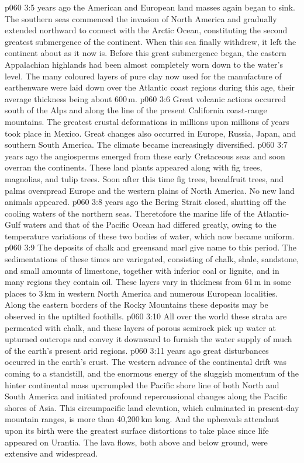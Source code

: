 \vs p060 3:5 \pc {} years ago the American and European land masses again began to sink. The southern seas commenced the invasion of North America and gradually extended northward to connect with the Arctic Ocean, constituting the second greatest submergence of the continent. When this sea finally withdrew, it left the continent about as it now is. Before this great submergence began, the eastern Appalachian highlands had been almost completely worn down to the water’s level. The many coloured layers of pure clay now used for the manufacture of earthenware were laid down over the Atlantic coast regions during this age, their average thickness being about 600\,m.
\vs p060 3:6 Great volcanic actions occurred south of the Alps and along the line of the present California coast\hyp{}range mountains. The greatest crustal deformations in millions upon millions of years took place in Mexico. Great changes also occurred in Europe, Russia, Japan, and southern South America. The climate became increasingly diversified.
\vs p060 3:7 \pc {} years ago the angiosperms emerged from these early Cretaceous seas and soon overran the continents. These land plants  appeared along with fig trees, magnolias, and tulip trees. Soon after this time fig trees, breadfruit trees, and palms overspread Europe and the western plains of North America. No new land animals appeared.
\vs p060 3:8 \pc {} years ago the Bering Strait closed, shutting off the cooling waters of the northern seas. Theretofore the marine life of the Atlantic\hyp{}Gulf waters and that of the Pacific Ocean had differed greatly, owing to the temperature variations of these two bodies of water, which now became uniform.
\vs p060 3:9 The deposits of chalk and greensand marl give name to this period. The sedimentations of these times are variegated, consisting of chalk, shale, sandstone, and small amounts of limestone, together with inferior coal or lignite, and in many regions they contain oil. These layers vary in thickness from 61\,m in some places to 3\,km in western North America and numerous European localities. Along the eastern borders of the Rocky Mountains these deposits may be observed in the uptilted foothills.
\vs p060 3:10 All over the world these strata are permeated with chalk, and these layers of porous semirock pick up water at upturned outcrops and convey it downward to furnish the water supply of much of the earth’s present arid regions.
\vs p060 3:11 \pc {} years ago great disturbances occurred in the earth’s crust. The western advance of the continental drift was coming to a standstill, and the enormous energy of the sluggish momentum of the hinter continental mass upcrumpled the Pacific shore line of both North and South America and initiated profound repercussional changes along the Pacific shores of Asia. This circumpacific land elevation, which culminated in present\hyp{}day mountain ranges, is more than 40,200\,km long. And the upheavals attendant upon its birth were the greatest surface distortions to take place since life appeared on Urantia. The lava flows, both above and below ground, were extensive and widespread.
